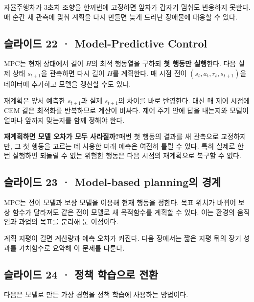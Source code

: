 \documentclass[11pt,a4paper]{article}
\begin{document}
자율주행차가 3초치 조향을 한꺼번에 고정하면 앞차가 갑자기 멈춰도 반응하지 못한다. 매 순간 새 관측에 맞춰 계획을 다시 만들면 늦게 드러난 장애물에 대응할 수 있다.\par

\subsection{슬라이드 22 · Model-Predictive Control}

MPC는 현재 상태에서 길이 $H$의 최적 행동열을 구하되 \textbf{첫 행동만 실행}한다. 다음 실제 상태 $s_{t+1}$을 관측하면 다시 길이 $H$를 계획한다. 매 시점 전이 $(s_t,a_t,r_t,s_{t+1})$을 데이터에 추가하고 모델을 갱신할 수도 있다.\par

재계획은 앞서 예측한 $s_{t+1}$과 실제 $s_{t+1}$의 차이를 바로 반영한다. 대신 매 제어 시점에 CEM 같은 최적화를 반복하므로 계산이 비싸다. 제어 주기 안에 답을 내는지와 모델이 얼마나 앞까지 맞는지를 함께 정해야 한다.\par

\par\medskip\noindent\textbf{재계획하면 모델 오차가 모두 사라질까?}\quad 매번 첫 행동의 결과를 새 관측으로 교정하지만, 그 첫 행동을 고르는 데 사용한 미래 예측은 여전히 틀릴 수 있다. 특히 실제로 한 번 실행하면 되돌릴 수 없는 위험한 행동은 다음 시점의 재계획으로 복구할 수 없다.\par

\subsection{슬라이드 23 · Model-based planning의 경계}

MPC는 전이 모델과 보상 모델을 이용해 현재 행동을 정한다. 목표 위치가 바뀌어 보상 함수가 달라져도 같은 전이 모델로 새 목적함수를 계획할 수 있다. 이는 환경의 움직임과 과업의 목표를 분리해 둔 이점이다.\par

계획 지평이 길면 계산량과 예측 오차가 커진다. 다음 장에서는 짧은 지평 뒤의 장기 성과를 가치함수로 요약해 이 문제를 다룬다.\par

\subsection{슬라이드 24 · 정책 학습으로 전환}

다음은 모델로 만든 가상 경험을 정책 학습에 사용하는 방법이다.\par
\end{document}
